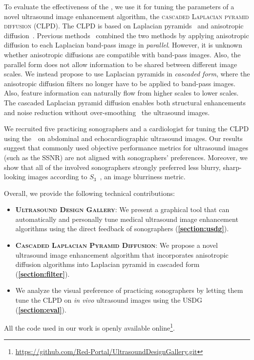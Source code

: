 To evaluate the effectiveness of the \usdg, we use it for tuning the parameters of a novel ultrasound image enhancement algorithm, the \textsc{cascaded Laplacian pyramid diffusion} (CLPD).
The CLPD is based on Laplacian pyramids~\cite{burt_laplacian_1983} and anisotropic diffusion~\cite{perona_scalespace_1990, weickert_anisotropic_1998}.
Previous methods~\cite{zhang_multiscale_2006, zhang_nonlinear_2007, kang_new_2016} combined the two methods by applying anisotropic diffusion to each Laplacian band-pass image in \textit{parallel}. However, it is unknown whether anisotropic diffusions are compatible with band-pass images.
Also, the parallel form does not allow information to be shared between different image scales.
We instead propose to use Laplacian pyramids in \textit{cascaded form}, where the anisotropic diffusion filters no longer have to be applied to band-pass images.
Also, feature information can naturally flow from higher scales to lower scales.
The cascaded Laplacian pyramid diffusion enables both structural enhancements and noise reduction without over-smoothing~\cite{ramos-llorden_anisotropic_2015, mishra_edge_2018} the ultrasound images.

We recruited five practicing sonographers and a cardiologist for tuning the CLPD using the~\usdg~on abdominal and echocardiographic ultrasound images.
Our results suggest that commonly used objective performance metrics for ultrasound images (such as the SSNR) are not aligned with sonographers' preferences.
Moreover, we show that all of the involved sonographers strongly preferred less blurry, sharp-looking images according to \(S_3\)~\cite{vu_bf_2012}, an image blurriness metric.

\noindent Overall, we provide the following technical contributions:
\begin{itemize}
  \item[\ding{228}] \textsc{\textbf{Ultrasound Design Gallery}}: We present a graphical tool that can automatically and personally tune medical ultrasound image enhancement algorithms using the direct feedback of sonographers (\textbf{\cref{section:usdg}}).
    \vspace{0.02in}
  \item[\ding{228}] \textsc{\textbf{Cascaded Laplacian Pyramid Diffusion}}:  We propose a novel ultrasound image enhancement algorithm that incorporates anisotropic diffusion algorithms into Laplacian pyramid in cascaded form (\textbf{\cref{section:filter}}).
  \item[\ding{228}] We analyze the visual preference of practicing sonographers by letting them tune the CLPD on \textit{in vivo} ultrasound images using the USDG (\textbf{\cref{section:eval}}).
\end{itemize}
All the code used in our work is openly available online\footnote{\url{https://github.com/Red-Portal/UltrasoundDesignGallery.git}}.


